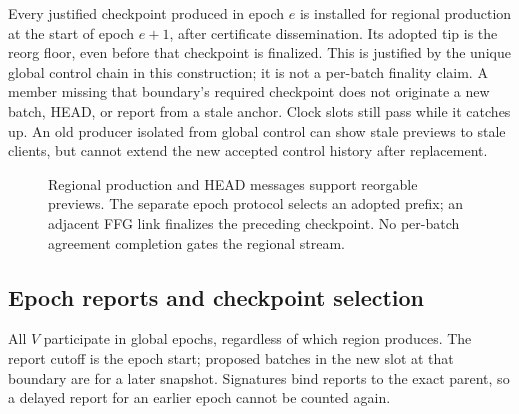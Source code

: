 \documentclass[11pt,a4paper,onecolumn]{article}
\theoremstyle{remark}\newtheorem{example}[definition]{Example}
\newcounter{protocol}
\begin{document}
Every justified checkpoint produced in epoch $e$ is installed for regional
production at the start of epoch $e+1$, after certificate dissemination. Its
adopted tip is the reorg floor, even before that checkpoint is finalized.
This is justified by the unique global control chain in this construction;
it is not a per-batch finality claim. A member missing that boundary's required
checkpoint does not originate a new batch, HEAD, or report from a stale anchor.
Clock slots still pass while it catches up. An old producer isolated from
global control can show stale previews to stale clients, but cannot extend the
new accepted control history after replacement.

\begin{figure}[htbp]\centering

\caption{Regional production and HEAD messages support reorgable previews.
The separate epoch protocol selects an adopted prefix; an adjacent FFG link
finalizes the preceding checkpoint. No per-batch agreement completion gates
the regional stream.}
\label{fig:stream}
\end{figure}

\subsection{Epoch reports and checkpoint selection}\label{sec:global}
All $V$ participate in global epochs, regardless of which region produces.
The report cutoff is the epoch start; proposed batches in the new slot at that
boundary are for a later snapshot. Signatures bind reports to the exact parent,
so a delayed report for an earlier epoch cannot be counted again.
\end{document}

